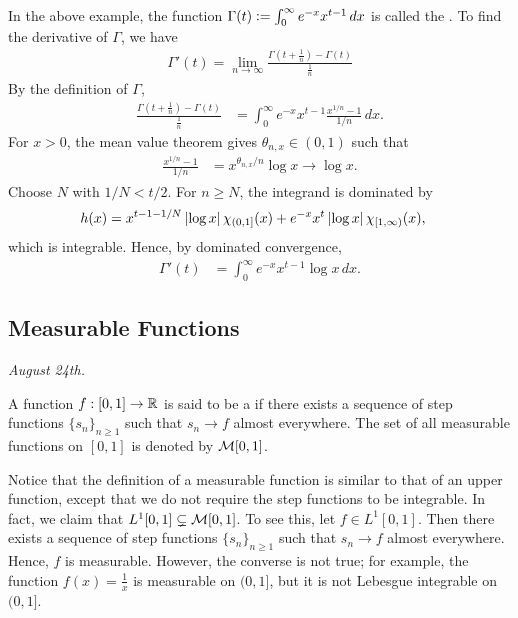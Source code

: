 In the above example, the function $\Gamma(t) \vcentcolon= \int_{0}^{\infty} e^{-x}x^{t-1} \, dx$ is called the . To find the derivative of $\Gamma$, we have
\begin{align}
    \Gamma'(t) = \lim_{n \to \infty} \frac{\Gamma(t+\frac{1}{n}) - \Gamma(t)}{\frac{1}{n}}
\end{align}
By the definition of $\Gamma$,
\begin{align}
    \frac{\Gamma(t+\frac{1}{n})-\Gamma(t)}{\frac{1}{n}}
    &=\int_{0}^{\infty}e^{-x}x^{t-1}\frac{x^{1/n}-1}{1/n}\,dx.
\end{align}
For $x>0$, the mean value theorem gives $\theta_{n,x}\in(0,1)$ such that
\begin{align}
    \frac{x^{1/n}-1}{1/n}&=x^{\theta_{n,x}/n}\log x
    \longrightarrow \log x.
\end{align}
Choose $N$ with $1/N<t/2$. For $n\geq N$, the integrand is dominated by
\begin{align}
    h(x)&=x^{t-1-1/N}\left| \log x \right|\chi_{(0,1]}(x)
    +e^{-x}x^{t}\left| \log x \right|\chi_{[1,\infty)}(x),
\end{align}
which is integrable. Hence, by dominated convergence,
\begin{align}
    \Gamma'(t)&=\int_{0}^{\infty}e^{-x}x^{t-1}\log x\,dx.
\end{align}

\subsection{Measurable Functions}
\textit{August 24th.}

\begin{definition}
    A function $f:[0,1] \to \mathbb{R}$ is said to be a  if there exists a sequence of step functions $\{s_{n}\}_{n \geq 1}$ such that $s_{n} \to f$ almost everywhere. The set of all measurable functions on $[0,1]$ is denoted by $\mathcal{M}[0,1]$.
\end{definition}
Notice that the definition of a measurable function is similar to that of an upper function, except that we do not require the step functions to be integrable. In fact, we claim that $L^{1}[0,1] \subsetneq \mathcal{M}[0,1]$. To see this, let $f \in L^{1}[0,1]$. Then there exists a sequence of step functions $\{s_{n}\}_{n \geq 1}$ such that $s_{n} \to f$ almost everywhere. Hence, $f$ is measurable. However, the converse is not true; for example, the function $f(x) = \frac{1}{x}$ is measurable on $(0,1]$, but it is not Lebesgue integrable on $(0,1]$.

